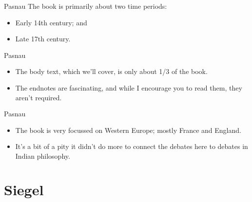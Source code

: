 \documentclass[
  17pt,
  letterpaper,
  ignorenonframetext,
  aspectratio=169,
  handout]{beamer}
\providecommand{\tightlist}{%
  \setlength{\itemsep}{0pt}\setlength{\parskip}{0pt}}\usepackage{longtable,booktabs,array}
\begin{document}
\begin{frame}{Pasnau}
\protect\hypertarget{pasnau-1}{}
The book is primarily about two time periods:

\begin{itemize}[<+->]
\tightlist
\item
  Early 14th century; and
\item
  Late 17th century.
\end{itemize}
\end{frame}

\begin{frame}{Pasnau}
\protect\hypertarget{pasnau-2}{}
\begin{itemize}[<+->]
\tightlist
\item
  The body text, which we'll cover, is only about 1/3 of the book.
\item
  The endnotes are fascinating, and while I encourage you to read them,
  they aren't required.
\end{itemize}
\end{frame}

\begin{frame}{Pasnau}
\protect\hypertarget{pasnau-3}{}
\begin{itemize}[<+->]
\tightlist
\item
  The book is very focussed on Western Europe; mostly France and
  England.
\item
  It's a bit of a pity it didn't do more to connect the debates here to
  debates in Indian philosophy.
\end{itemize}
\end{frame}

\hypertarget{siegel}{%
\section{Siegel}\label{siegel}}
\end{document}
